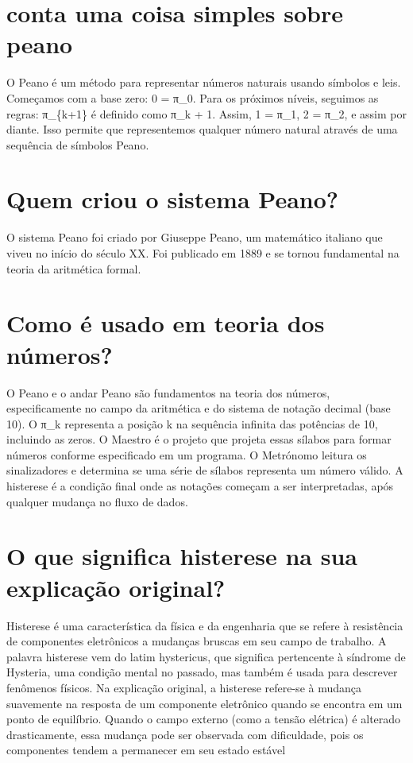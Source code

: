 \documentclass[11pt,a4paper]{article}
\begin{document}
\section{conta uma coisa simples sobre peano}
O Peano é um método para representar números naturais usando símbolos e leis. Começamos com a base zero: 0 = π\_0. Para os próximos níveis, seguimos as regras: π\_\{k+1\} é definido como π\_k + 1. Assim, 1 = π\_1, 2 = π\_2, e assim por diante. Isso permite que representemos qualquer número natural através de uma sequência de símbolos Peano.

\section{Quem criou o sistema Peano?}
O sistema Peano foi criado por Giuseppe Peano, um matemático italiano que viveu no início do século XX. Foi publicado em 1889 e se tornou fundamental na teoria da aritmética formal.

\section{Como é usado em teoria dos números?}
O Peano e o andar Peano são fundamentos na teoria dos números, especificamente no campo da aritmética e do sistema de notação decimal (base 10). O π\_k representa a posição k na sequência infinita das potências de 10, incluindo as zeros. O Maestro é o projeto que projeta essas sílabos para formar números conforme especificado em um programa. O Metrónomo leitura os sinalizadores e determina se uma série de sílabos representa um número válido. A histerese é a condição final onde as notações começam a ser interpretadas, após qualquer mudança no fluxo de dados.

\section{O que significa histerese na sua explicação original?}
Histerese é uma característica da física e da engenharia que se refere à resistência de componentes eletrônicos a mudanças bruscas em seu campo de trabalho. A palavra histerese vem do latim hystericus, que significa pertencente à síndrome de Hysteria, uma condição mental no passado, mas também é usada para descrever fenômenos físicos. Na explicação original, a histerese refere-se à mudança suavemente na resposta de um componente eletrônico quando se encontra em um ponto de equilíbrio. Quando o campo externo (como a tensão elétrica) é alterado drasticamente, essa mudança pode ser observada com dificuldade, pois os componentes tendem a permanecer em seu estado estável
\end{document}
